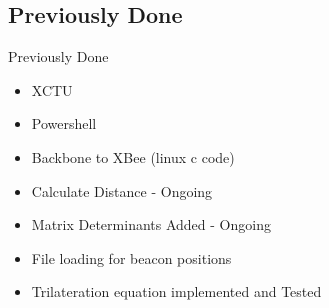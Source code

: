 \documentclass{beamer}
\begin{document}



\subsection{Previously Done}
\begin{frame}{Previously Done}
    \begin{itemize}
    \item XCTU
    \item Powershell
    \item Backbone to XBee (linux c code)
    \item Calculate Distance - Ongoing
    \item Matrix Determinants Added - Ongoing
    \item File loading for beacon positions
    \item Trilateration equation implemented and Tested
    \end{itemize}
\end{frame}
\end{document}
